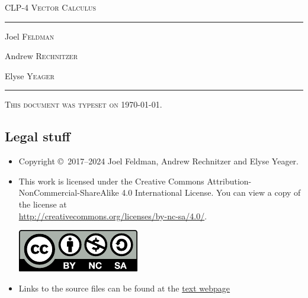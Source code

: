 \documentclass[12pt,letterpaper, openany]{book}
\begin{document}
\setcounter{page}{0}

\begin{titlepage} 
\begin{center} 
\textsc{\LARGE
CLP-4 Vector Calculus
}\\[2ex]

\vspace{5ex}
\hrule
\vspace{5ex}

\begin{minipage}[t]{0.3\textwidth} \begin{flushleft}
\large Joel \textsc{Feldman}
\end{flushleft} \end{minipage}%
\begin{minipage}[t]{0.3\textwidth} \begin{flushleft}
\large Andrew \textsc{Rechnitzer}
\end{flushleft} \end{minipage}%
\begin{minipage}[t]{0.3\textwidth} \begin{flushright}
\large Elyse \textsc{Yeager}
\end{flushright} \end{minipage}%
\end{center}
\vspace{2ex}
\hrule

\vfill
\textsc{This document was typeset on \today.}
\end{titlepage}

\subsection*{Legal stuff}
\begin{itemize}
 \item Copyright \copyright\ 2017--2024 Joel Feldman, Andrew Rechnitzer and Elyse Yeager.

\item This work is licensed under the
Creative Commons Attribution-NonCommercial-ShareAlike 4.0 International
License. You can view a copy of the license at \\
\url{http://creativecommons.org/licenses/by-nc-sa/4.0/}.
\begin{center}
 \includegraphics{by-nc-sa.pdf}
\end{center}


\item Links to the source files can be found at the \href{http://www.math.ubc.ca/~CLP/index.html}{text webpage}
\end{itemize}
\end{document}
